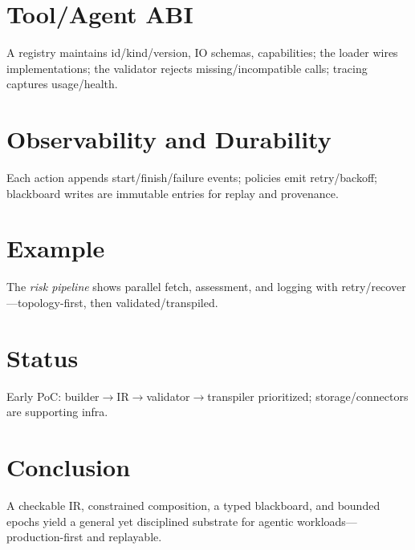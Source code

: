 \documentclass[11pt,a4paper]{article}
\begin{document}
\section{Tool/Agent ABI}
A registry maintains id/kind/version, IO schemas, capabilities; the loader wires implementations; the validator rejects missing/incompatible calls; tracing captures usage/health.
\section{Observability and Durability}
Each action appends start/finish/failure events; policies emit retry/backoff; blackboard writes are immutable entries for replay and provenance.
\section{Example}
The \emph{risk pipeline} shows parallel fetch, assessment, and logging with retry/recover—topology-first, then validated/transpiled.
\section{Status}
Early PoC: builder$\rightarrow$IR$\rightarrow$validator$\rightarrow$transpiler prioritized; storage/connectors are supporting infra.
\section{Conclusion}
A checkable IR, constrained composition, a typed blackboard, and bounded epochs yield a general yet disciplined substrate for agentic workloads—production-first and replayable.
\end{document}
